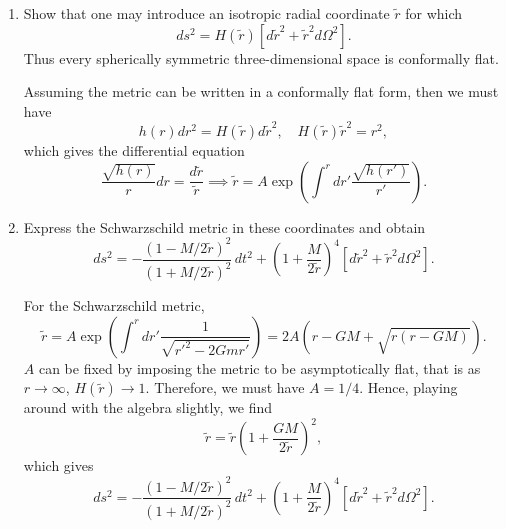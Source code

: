 \begin{enumerate}[label=\alph*)]
    \item Show that one may introduce an isotropic radial coordinate $\widetilde r$
    for which
    \begin{equation}
        ds^2=H(\widetilde r)
        \left[d\widetilde r^2+\widetilde r^2d\Omega^2\right].
    \end{equation}
    Thus every spherically symmetric three-dimensional space is conformally flat.
    \begin{solution}
        Assuming the metric can be written in a conformally flat form, then we must have
        \begin{equation}
            h(r)dr^2  = H(\tilde r)d\tilde r^2, \quad H(\tilde r)\tilde r^2 = r^2,
        \end{equation}
        which gives the differential equation
        \begin{equation}
            \frac{\sqrt{h(r)}}{r}dr = \frac{d \tilde r}{\tilde r} \implies \tilde r = A \exp\left( \int^r dr' \frac{\sqrt{h(r')}}{r'}\right).
        \end{equation}

    \end{solution}

    \item Express the Schwarzschild metric in these coordinates and obtain
    \begin{equation}
        ds^2
        =-\frac{(1-M/2\widetilde r)^2}{(1+M/2\widetilde r)^2}\,dt^2
        +\left(1+\frac{M}{2\widetilde r}\right)^4
        \left[d\widetilde r^2+\widetilde r^2d\Omega^2\right].
    \end{equation}
    \begin{solution}
        For the Schwarzschild metric,
        \begin{equation}
            \tilde r = A \exp\left(\int ^r dr' \frac{1}{\sqrt{r'^2 - 2Gmr'}}\right) = 2A\left(r-GM + \sqrt{r(r-GM)}\right).
        \end{equation}
        $A$ can be fixed by imposing the metric to be asymptotically flat, that is as $r \to \infty$, $H(\tilde r ) \to 1$. Therefore, we must have $A = 1/4$.
        Hence, playing around with the algebra slightly, we find
        \begin{equation}
            \tilde r = \tilde r\left(1 + \frac{GM}{2\tilde r}\right)^2,
        \end{equation}
        which gives
            \begin{equation}
        ds^2
        =-\frac{(1-M/2\widetilde r)^2}{(1+M/2\widetilde r)^2}\,dt^2
        +\left(1+\frac{M}{2\widetilde r}\right)^4
        \left[d\widetilde r^2+\widetilde r^2d\Omega^2\right].
    \end{equation}
    \end{solution}
\end{enumerate}


